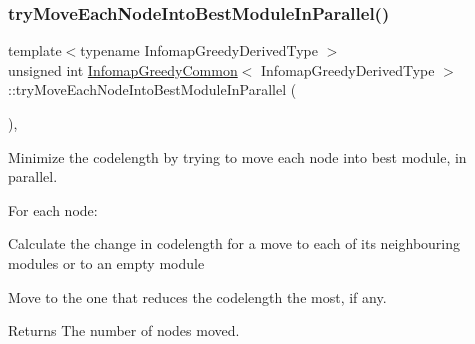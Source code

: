 \subsubsection{\texorpdfstring{try\+Move\+Each\+Node\+Into\+Best\+Module\+In\+Parallel()}{tryMoveEachNodeIntoBestModuleInParallel()}}
{\footnotesize\ttfamily template$<$typename Infomap\+Greedy\+Derived\+Type $>$ \\
unsigned int \mbox{\hyperlink{classInfomapGreedyCommon}{Infomap\+Greedy\+Common}}$<$ Infomap\+Greedy\+Derived\+Type $>$\+::try\+Move\+Each\+Node\+Into\+Best\+Module\+In\+Parallel (\begin{DoxyParamCaption}{ }\end{DoxyParamCaption})\hspace{0.3cm}{\ttfamily [inline]}, {\ttfamily [protected]}}

Minimize the codelength by trying to move each node into best module, in parallel.

For each node\+:
\begin{DoxyEnumerate}
\item Calculate the change in codelength for a move to each of its neighbouring modules or to an empty module
\item Move to the one that reduces the codelength the most, if any.
\end{DoxyEnumerate}

\begin{DoxyReturn}{Returns}
The number of nodes moved. 
\end{DoxyReturn}

